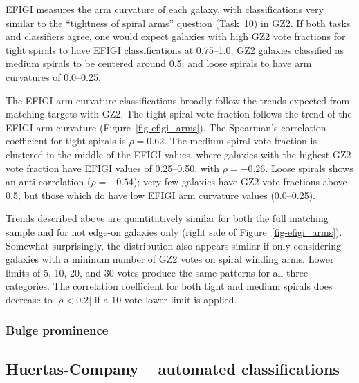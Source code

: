 \documentclass[useAMS,usenatbib]{mn2e}
\begin{document}
EFIGI measures the arm curvature of each galaxy, with classifications very similar to the ``tightness of spiral arms'' question (Task~10) in GZ2. If both tasks and classifiers agree, one would expect galaxies with high GZ2 vote fractions for tight spirals to have EFIGI classifications at 0.75--1.0; GZ2 galaxies classified as medium spirals to be centered around 0.5; and loose spirals to have arm curvatures of 0.0--0.25. 

The EFIGI arm curvature classifications broadly follow the trends expected from matching targets with GZ2. The tight spiral vote fraction follows the trend of the EFIGI arm curvature (Figure~\ref{fig-efigi_arms}). The Spearman's correlation coefficient for tight spirals is $\rho=0.62$. The medium spiral vote fraction is clustered in the middle of the EFIGI values, where galaxies with the highest GZ2 vote fraction have EFIGI values of 0.25--0.50, with $\rho=-0.26$. Loose spirals shows an anti-correlation ($\rho=-0.54$); very few galaxies have GZ2 vote fractions above 0.5, but those which do have low EFIGI arm curvature values (0.0--0.25). 

Trends described above are quantitatively similar for both the full matching sample and for not edge-on galaxies only (right side of Figure~\ref{fig-efigi_arms}). Somewhat surprisingly, the distribution also appears similar if only considering galaxies with a mininum number of GZ2 votes on spiral winding arms. Lower limits of 5, 10, 20, and 30 votes produce the same patterns for all three categories. The correlation coefficient for both tight and medium spirals does decrease to $|\rho<0.2|$ if a 10-vote lower limit is applied. 

\subsubsection{Bulge prominence}

\subsection{Huertas-Company -- automated classifications}
\end{document}
